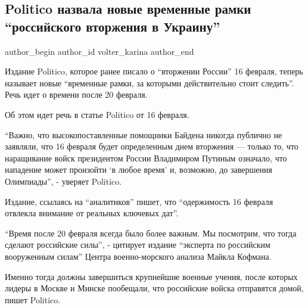  
 
 
 
 
 
\subsection{Politico назвала новые временные рамки \enquote{российского вторжения в Украину}}
\label{sec:17_02_2022.stz.news.ua.strana.1.politico_vtorzhenie_ramki}
 
\ifcmt
 author_begin
   author_id volter_karina
 author_end
\fi

Издание Politico, которое ранее писало о \enquote{вторжении России} 16 февраля,
теперь называет новые \enquote{временные рамки, за которыми действительно стоит
следить}. Речь идет о времени после 20 февраля.


Об этом идет речь в статье Politico от 16 февраля.

\enquote{Важно, что высокопоставленные помощники Байдена никогда публично не заявляли,
что 16 февраля будет определенным днем вторжения — только то, что наращивание
войск президентом России Владимиром Путиным означало, что нападение может
произойти \enquote{в любое время} и, возможно, до завершения Олимпиады}, - уверяет
Politico.

Издание, ссылаясь на \enquote{аналитиков} пишет, что \enquote{одержимость 16 февраля отвлекла
внимание от реальных ключевых дат}.

\enquote{Время после 20 февраля всегда было более важным. Мы посмотрим, что тогда
сделают российские силы}, - цитирует издание \enquote{эксперта по российским
вооруженным силам} Центра военно-морского анализа Майкла Кофмана.

Именно тогда должны завершиться крупнейшие военные учения, после которых лидеры
в Москве и Минске пообещали, что российские войска отправятся домой, пишет
Politico.

